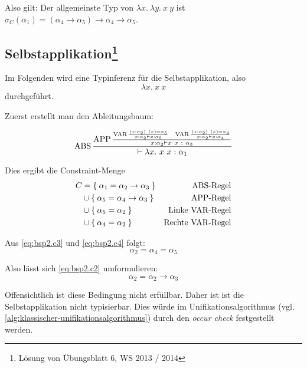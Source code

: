 Also gilt: Der allgemeinste Typ von $\lambda x.\ \lambda y.\ x\ y$ ist $\sigma_C (\alpha_1) = (\alpha_4 \rightarrow \alpha_5) \rightarrow \alpha_4 \rightarrow \alpha_5$.

\subsection[Selbstapplikation]{Selbstapplikation\footnote{Lösung von Übungsblatt 6, WS 2013 / 2014}}
Im Folgenden wird eine Typinferenz für die Selbstapplikation, also
\[\lambda x.\ x\ x\]
durchgeführt.

Zuerst erstellt man den Ableitungsbaum:

\[\ABS\frac{\APP \frac{\VAR \frac{(x:\alpha_2)\ (x) = \alpha_5}{x:\alpha_2 \vdash x: \alpha_5} \;\;\; \VAR \frac{(x:\alpha_2)\ (x) = \alpha_4}{x:\alpha_2 \vdash x:\alpha_4}}{x: \alpha_2 \vdash x\ x\ :\ \alpha_3}}{\vdash \lambda x.\ x\ x: \alpha_1}\]

Dies ergibt die Constraint-Menge
\begin{align}
	C&= \Set{\alpha_1 = \alpha_2 \rightarrow \alpha_3}    &\text{$\operatorname{ABS}$-Regel}\label{eq:bsp2.c1}\\ 
     &\cup \Set{\alpha_5 = \alpha_4 \rightarrow \alpha_3} &\text{$\operatorname{APP}$-Regel}\label{eq:bsp2.c2}\\
     &\cup \Set{\alpha_5 = \alpha_2}                      &\text{Linke $\operatorname{VAR}$-Regel}\label{eq:bsp2.c3}\\
     &\cup \Set{\alpha_4 = \alpha_2}                      &\text{Rechte $\operatorname{VAR}$-Regel}\label{eq:bsp2.c4}
\end{align}

Aus \cref{eq:bsp2.c3} und \cref{eq:bsp2.c4} folgt:
\[\alpha_2 = \alpha_4 = \alpha_5\]

Also lässt sich \cref{eq:bsp2.c2} umformulieren:
\[\alpha_2 = \alpha_2 \rightarrow \alpha_3\]

Offensichtlich ist diese Bedingung nicht erfüllbar. Daher ist ist die Selbstapplikation
nicht typisierbar. Dies würde im Unifikationsalgorithmus 
(vgl. \cref{alg:klassischer-unifikationsalgorithmus})
durch den \textit{occur check} festgestellt werden.